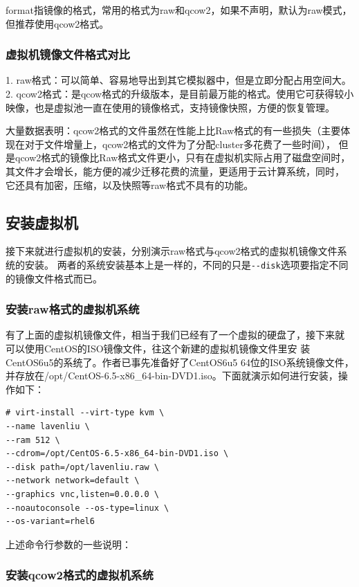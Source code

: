 format指镜像的格式，常用的格式为raw和qcow2，如果不声明，默认为raw模式，
但推荐使用qcow2格式。

\subsubsection{虚拟机镜像文件格式对比}
\label{sec:createImgContrast}

1.	raw格式：可以简单、容易地导出到其它模拟器中，但是立即分配占用空间大。
2.	qcow2格式：是qcow格式的升级版本，是目前最万能的格式。使用它可获得较小映像，也是虚拟池一直在使用的镜像格式，支持镜像快照，方便的恢复管理。

大量数据表明：qcow2格式的文件虽然在性能上比Raw格式的有一些损失（主要体
现在对于文件增量上，qcow2格式的文件为了分配cluster多花费了一些时间），
但是qcow2格式的镜像比Raw格式文件更小，只有在虚拟机实际占用了磁盘空间时，
其文件才会增长，能方便的减少迁移花费的流量，更适用于云计算系统，同时，
它还具有加密，压缩，以及快照等raw格式不具有的功能。

\subsection{安装虚拟机}
\label{sec:installVM}

接下来就进行虚拟机的安装，分别演示raw格式与qcow2格式的虚拟机镜像文件系统的安装。
两者的系统安装基本上是一样的，不同的只是\verb|--disk|选项要指定不同的镜像文件格式而已。

\subsubsection{安装raw格式的虚拟机系统}
\label{sec:installRawVM}

有了上面的虚拟机镜像文件，相当于我们已经有了一个虚拟的硬盘了，接下来就
可以使用CentOS的ISO镜像文件，往这个新建的虚拟机镜像文件里安
装CentOS6u5的系统了。作者已事先准备好了CentOS6u5 64位的ISO系统镜像文件，
并存放在/opt/CentOS-6.5-x86\_64-bin-DVD1.iso。下面就演示如何进行安装，操
作如下：

\begin{verbatim}
# virt-install --virt-type kvm \
--name lavenliu \
--ram 512 \
--cdrom=/opt/CentOS-6.5-x86_64-bin-DVD1.iso \
--disk path=/opt/lavenliu.raw \
--network network=default \
--graphics vnc,listen=0.0.0.0 \
--noautoconsole --os-type=linux \
--os-variant=rhel6
\end{verbatim}

上述命令行参数的一些说明：

\subsubsection{安装qcow2格式的虚拟机系统}
\label{sec:installQcow2VM}


